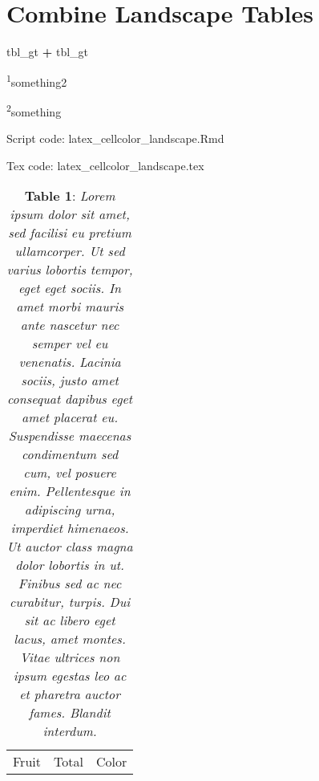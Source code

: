 \documentclass[]{article}
\newenvironment{Shaded}{\begin{snugshade}}{\end{snugshade}}
\newcommand{\NormalTok}[1]{#1}
\newcommand{\OperatorTok}[1]{\textcolor[rgb]{0.81,0.36,0.00}{\textbf{#1}}}
\newcommand{\StringTok}[1]{\textcolor[rgb]{0.31,0.60,0.02}{#1}}
\def\settotextwidth{\renewcommand\TPTminimum{\textwidth}}
\begin{document}
\hypertarget{combine-landscape-tables}{%
\section{Combine Landscape Tables}\label{combine-landscape-tables}}

\begin{Shaded}
\begin{Highlighting}[]
\NormalTok{tbl_gt }\OperatorTok{+}\StringTok{ }\NormalTok{tbl_gt}
\end{Highlighting}
\end{Shaded}

\begin{landscape}
\pagestyle{empty}
\begin{ThreePartTable}
\settotextwidth\begin{TableNotes}
\centering
\footnotesize
\item \textsuperscript{1}something2
\item \textsuperscript{2}something
\item
\item Script code: latex\_cellcolor\_landscape.Rmd
\item Tex code: latex\_cellcolor\_landscape.tex
\end{TableNotes}
\setlength{\tabcolsep}{3pt}
\captionsetup[table]{labelformat=empty,skip=3pt, justification=raggedright, width =\textwidth}
\begin{longtable}{p{1.13cm}p{1.13cm}p{1.13cm}} 
\caption{\textbf{Table 1}: \textit{Lorem ipsum dolor sit amet, sed facilisi eu pretium ullamcorper. Ut sed varius lobortis tempor, eget eget sociis. In amet morbi mauris ante nascetur nec semper vel eu venenatis. Lacinia sociis, justo amet consequat dapibus eget amet placerat eu. Suspendisse maecenas condimentum sed cum, vel posuere enim. Pellentesque in adipiscing urna, imperdiet himenaeos. Ut auctor class magna dolor lobortis in ut. Finibus sed ac nec curabitur, turpis. Dui sit ac libero eget lacus, amet montes. Vitae ultrices non ipsum egestas leo ac et pharetra auctor fames. Blandit interdum.}} \\
\toprule
Fruit & Total & Color \\ 

\end{longtable}
\end{ThreePartTable}
\end{landscape}
\end{document}
